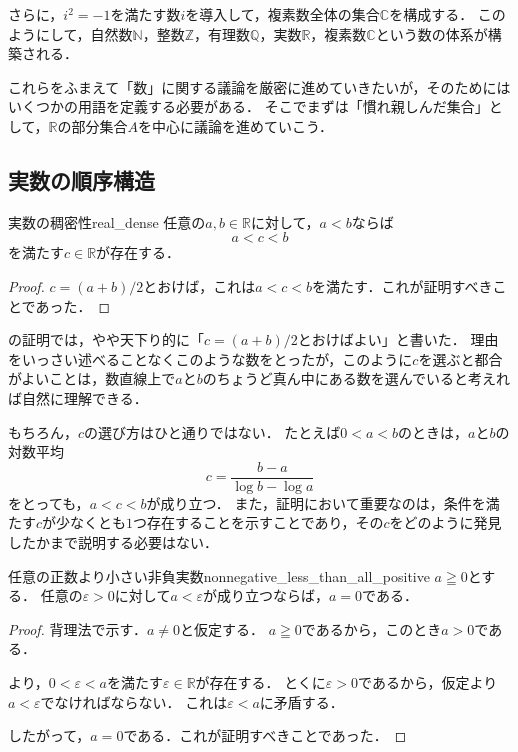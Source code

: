 さらに，$i^2 = -1$を満たす数$i$を導入して，複素数全体の集合$\mathbb{C}$を構成する．
このようにして，自然数$\mathbb{N}$，整数$\mathbb{Z}$，有理数$\mathbb{Q}$，実数$\mathbb{R}$，複素数$\mathbb{C}$という数の体系が構築される．

これらをふまえて「数」に関する議論を厳密に進めていきたいが，そのためにはいくつかの用語を定義する必要がある．
そこでまずは「慣れ親しんだ集合」として，$\mathbb{R}$の部分集合$A$を中心に議論を進めていこう．

\subsection{実数の順序構造}

\begin{prop}{実数の稠密性}{real_dense}
  任意の$a,b \in \mathbb{R}$に対して，$a < b$ならば
  \[
    a < c < b
  \]
  を満たす$c \in \mathbb{R}$が存在する．
\end{prop}

\begin{tleftbar}
  \begin{proof}
    $c = (a+b)/2$とおけば，これは$a < c < b$を満たす．これが証明すべきことであった．
  \end{proof}
\end{tleftbar}

の証明では，やや天下り的に「$c = (a+b)/2$とおけばよい」と書いた．
理由をいっさい述べることなくこのような数をとったが，このように$c$を選ぶと都合がよいことは，数直線上で$a$と$b$のちょうど真ん中にある数を選んでいると考えれば自然に理解できる．

もちろん，$c$の選び方はひと通りではない．
たとえば$0 < a < b$のときは，$a$と$b$の対数平均
\[
  c = \frac{b-a}{\log b - \log a}
\]
をとっても，$a < c < b$が成り立つ．
また，証明において重要なのは，条件を満たす$c$が少なくとも$1$つ存在することを示すことであり，その$c$をどのように発見したかまで説明する必要はない．

\begin{prop}{任意の正数より小さい非負実数}{nonnegative_less_than_all_positive}
  $a \geqq 0$とする．
  任意の$\varepsilon > 0$に対して$a < \varepsilon$が成り立つならば，$a = 0$である．
\end{prop}

\begin{tleftbar}
  \begin{proof}
    背理法で示す．$a \ne 0$と仮定する．
    $a \geqq 0$であるから，このとき$a > 0$である．

    より，$0 < \varepsilon < a$を満たす$\varepsilon \in \mathbb{R}$が存在する．
    とくに$\varepsilon > 0$であるから，仮定より$a < \varepsilon$でなければならない．
    これは$\varepsilon < a$に矛盾する．

    したがって，$a = 0$である．これが証明すべきことであった．
  \end{proof}
\end{tleftbar}

